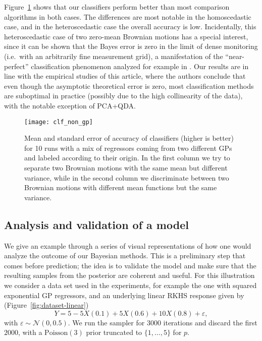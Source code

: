 Figure~\ref{fig:clf_non_gp} shows that our classifiers perform better than most comparison algorithms in both cases. The differences are most notable in the homoscedastic case, and in the heteroscedastic case the overall accuracy is low. Incidentally, this heteroscedastic case of two zero-mean Brownian motions has a special interest, since it can be shown that the Bayes error is zero in the limit of dense monitoring (i.e.\ with an arbitrarily fine measurement grid), a manifestation of the ``near-perfect'' classification phenomenon analyzed for example in \citet{torrecilla2020optimal}. Our results are in line with the empirical studies of this article, where the authors conclude that even though the asymptotic theoretical error is zero, most classification methods are suboptimal in practice (possibly due to the high collinearity of the data), with the notable exception of PCA+QDA.

\begin{figure}[ht!]
  \centering
  \texttt{[image: clf\_non\_gp]}
  \caption{Mean and standard error of accuracy of classifiers (higher is better) for 10 runs with a mix of regressors coming from two different GPs and labeled according to their origin. In the first column we try to separate two Brownian motions with the same mean but different variance, while in the second column we discriminate between two Brownian motions with different mean functions but the same variance.}\label{fig:clf_non_gp}
\end{figure}

\subsection{Analysis and validation of a model}\label{app:validation}

We give an example through a series of visual representations of how one would analyze the outcome of our Bayesian methods. This is a preliminary step that comes before prediction; the idea is to validate the model and make sure that the resulting samples from the posterior are coherent and useful. For this illustration we consider a data set used in the experiments, for example the one with squared exponential GP regressors, and an underlying linear RKHS response given by (Figure~\ref{fig:dataset-linear})
\[
Y=5 - 5X(0.1) + 5X(0.6) + 10X(0.8) + \varepsilon, 
\] 
with \(\varepsilon \sim \mathcal N(0, 0.5)\). We run the sampler for \(3000\) iterations and discard the first \(2000\), with a \(\text{Poisson}(3)\) prior truncated to \(\{1,\dots,5\}\) for \(p\). 

